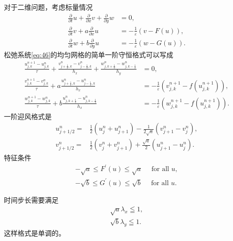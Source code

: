 \documentclass[12pt]{article}
\begin{document}
对于二维问题，考虑标量情况
\begin{equation}
	\begin{aligned}
		\frac{\partial}{\partial t} {u}+\frac{\partial}{\partial x} {v}+\frac{\partial}{\partial y} {w} &=0, \\
		\frac{\partial}{\partial t} {v}+{a} \frac{\partial}{\partial x} {u} &=-\frac{1}{{\varepsilon}}({v}-F({u})),\\
		\frac{\partial}{\partial t} {w}+{b} \frac{\partial}{\partial y} {u}&=-\frac{1}{{\varepsilon}}({w}-G({u})).
		\end{aligned}
		\label{eq:46}
\end{equation}
松弛系统\cref{eq:46}的均匀网格的简单一阶守恒格式可以写成
\begin{equation}
	\begin{aligned}
		\frac{u_{j,k}^{n+1}-u_{j,k}^{n}}{\tau}+ \frac{v_{j+\frac{1}{2},k}^{n}-v_{j-\frac{1}{2},k}^{n}}{h_x}+ \frac{w_{j,k+\frac{1}{2}}^{n}-w_{j,k-\frac{1}{2}}^{n}}{h_y}&=0, \\
		\frac{v_{j,k}^{n+1}-v_{j,k}^{n}}{\tau}+a \frac{u_{j+\frac{1}{2},k}^{n}-u_{j-\frac{1}{2},k}^{n}}{h_x} &=-\frac{1}{\varepsilon}\left(v_{j,k}^{n+1}-f\left(u_{j,k}^{n+1}\right)\right),\\
		\frac{w_{j,k}^{n+1}-w_{j,k}^{n}}{\tau}+b \frac{u_{j,k+\frac{1}{2}}^{n}-u_{j,k-\frac{1}{2}}^{n}}{h_x} &=-\frac{1}{\varepsilon}\left(w_{j,k}^{n+1}-f\left(u_{j,k}^{n+1}\right)\right).
		\end{aligned}
	\label{eq:47}
\end{equation}
一阶迎风格式是
\begin{equation}
	\begin{aligned}
		u_{j+1 / 2}^{n}=&\frac{1}{2}\left(u_{j}^{n}+u_{j+1}^{n}\right)-\frac{1}{2 \sqrt{a}}\left(v_{j+1}^{n}-v_{j}^{n}\right), \\
		v_{j+1 / 2}^{n}=&\frac{1}{2}\left(v_{j}^{n}+v_{j+1}^{n}\right)+\frac{\sqrt{a}}{2}\left(u_{j+1}^{n}-u_{j}^{n}\right).
	\end{aligned}
\end{equation}
特征条件
\begin{gather}
	-\sqrt{a} \leq F^{\prime}(u) \leq \sqrt{a} \quad \text { for all } u,\\
	-\sqrt{b} \leq G^{\prime}(u) \leq \sqrt{b} \quad \text { for all } u.
\end{gather}

时间步长需要满足
\begin{gather}
	\sqrt{a} \lambda_x \leqq 1,\\
	\sqrt{b} \lambda_y \leqq 1.
\end{gather}
这样格式是单调的。




\end{document}
